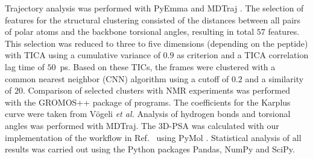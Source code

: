 Trajectory analysis was performed with PyEmma \cite{Scherer2015} and MDTraj \cite{Mcgibbon2015}. 
The selection of features for the structural clustering consisted of the distances between all pairs of polar atoms and the backbone torsional angles, resulting in total $57$ features. 
This selection was reduced to three to five dimensions (depending on the peptide) with TICA \cite{Molgedey1994} using a cumulative variance of $0.9$ as criterion and a TICA correlation lag time of $50$~ps. 
Based on these TICs, the frames were clustered with a common nearest neighbor (CNN) algorithm \cite{Keller2010, Weiß2021} using a cutoff of $0.2$ and a similarity of $20$. 
Comparison of selected clusters with NMR experiments was performed with the GROMOS++ package of programs. \cite{Eichenberger2011}
The coefficients for the Karplus curve were taken from Vögeli \textit{et al.} \cite{Voegeli2015}
Analysis of hydrogen bonds and torsional angles was performed with MDTraj. 
The 3D-PSA was calculated with our implementation \cite{Witek2019} of the workflow in Ref.~ using PyMol \cite{Delano2020}.
Statistical analysis of all results was carried out using the Python packages Pandas, NumPy and SciPy.\cite{Virtanen2020}


